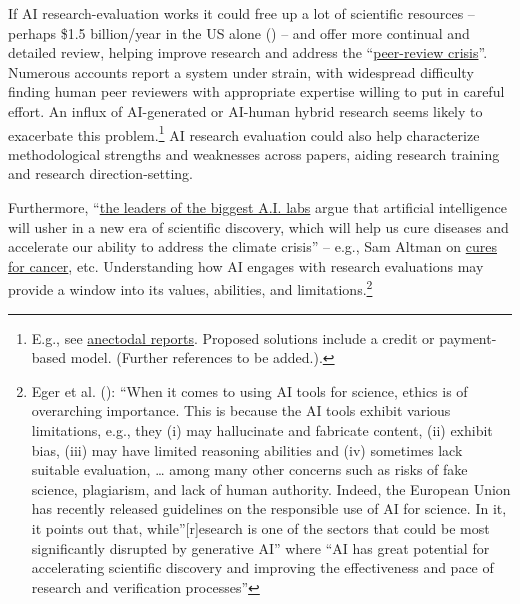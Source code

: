 \documentclass[
  11pt,
  letterpaper,
  DIV=11,
  numbers=noendperiod]{scrreprt}
\begin{document}
If AI research-evaluation works it could free up a lot of scientific
resources -- perhaps \$1.5 billion/year in the US alone
() --
and offer more continual and detailed review, helping improve research
and address the
``\href{https://www.nature.com/articles/d41586-025-02457-2}{peer-review
crisis}''. Numerous accounts report a system under strain, with
widespread difficulty finding human peer reviewers with appropriate
expertise willing to put in careful effort. An influx of AI-generated or
AI-human hybrid research seems likely to exacerbate this
problem.\footnote{E.g., see
  \href{https://www.linkedin.com/feed/update/urn:li:activity:7411759911480524800/}{anectodal
  reports}. Proposed solutions include a credit or payment-based model.
  (Further references to be added.).} AI research evaluation could also
help characterize methodological strengths and weaknesses across papers,
aiding research training and research direction-setting.

Furthermore,
``\href{https://www.nytimes.com/2025/12/26/podcasts/hardfork-ai-science.html}{the
leaders of the biggest A.I. labs} argue that artificial intelligence
will usher in a new era of scientific discovery, which will help us cure
diseases and accelerate our ability to address the climate crisis'' --
e.g., Sam Altman on
\href{https://blog.samaltman.com/abundant-intelligence}{cures for
cancer}, etc. Understanding how AI engages with research evaluations may
provide a window into its values, abilities, and limitations.\footnote{Eger
  et al. (): ``When it comes to using AI
  tools for science, ethics is of overarching importance. This is
  because the AI tools exhibit various limitations, e.g., they (i) may
  hallucinate and fabricate content, (ii) exhibit bias, (iii) may have
  limited reasoning abilities and (iv) sometimes lack suitable
  evaluation, \ldots{} among many other concerns such as risks of fake
  science, plagiarism, and lack of human authority. Indeed, the European
  Union has recently released guidelines on the responsible use of AI
  for science. In it, it points out that, while''{[}r{]}esearch is one
  of the sectors that could be most significantly disrupted by
  generative AI'' where ``AI has great potential for accelerating
  scientific discovery and improving the effectiveness and pace of
  research and verification processes''}
\end{document}
